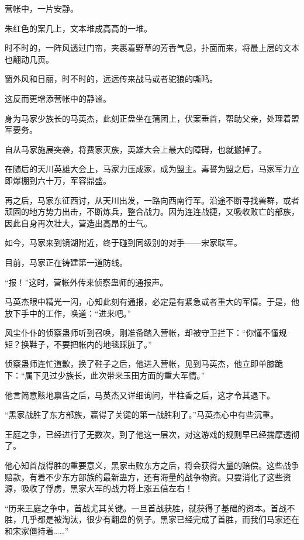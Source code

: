 
\begin{this_body}

营帐中，一片安静。

朱红色的案几上，文本堆成高高的一堆。

时不时的，一阵风透过门帘，夹裹着野草的芳香气息，扑面而来，将最上层的文本也翻动几页。

窗外风和日丽，时不时的，远远传来战马或者驼狼的嘶鸣。

这反而更增添营帐中的静谧。

身为马家少族长的马英杰，此刻正盘坐在蒲团上，伏案垂首，帮助父亲，处理着盟军要务。

自从马家施展突袭，将费家灭族，英雄大会上最大的障碍，也就搬掉了。

在随后的天川英雄大会上，马家力压成家，成为盟主。毒誓为盟之后，马家军力立即爆棚到六十万，军容鼎盛。

再之后，马家东征西讨，从天川出发，一路向西南行军。沿途不断寻找兽群，或者顽固的地方势力出击，不断炼兵，整合战力。因为连连战捷，又吸收败亡的部族，因此自身再次壮大，营造出高昂的士气。

如今，马家来到镜湖附近，终于碰到同级别的对手——宋家联军。

目前，马家正在铸建第一道防线。

“报！”这时，营帐外传来侦察蛊师的通报声。

马英杰眼中精光一闪，心知此刻有通报，必定是有紧急或者重大的军情。于是，他放下手中的工作，唤道：“进来吧。”

风尘仆仆的侦察蛊师听到召唤，刚准备踏入营帐，却被守卫拦下：“你懂不懂规矩？换鞋子，不要把帐内的地毯踩脏了。”

侦察蛊师连忙道歉，换了鞋子之后，他进入营帐，见到马英杰，他立即单膝跪下：“属下见过少族长，此次带来玉田方面的重大军情。”

他言简意赅地禀告之后，马英杰又详细询问，半柱香之后，这才令其退下。

“黑家战胜了东方部族，赢得了关键的第一战胜利了。”马英杰心中有些沉重。

王庭之争，已经进行了无数次，到了他这一层次，对这游戏的规则早已经揣摩透彻了。

他心知首战得胜的重要意义，黑家击败东方之后，将会获得大量的赔偿。这些战争赔款，有着不少东方部族的最新蛊方，还有海量的战争物资。只要消化了这些资源，吸收了俘虏，黑家大军的战力将上涨五倍左右！

“历来王庭之争中，首战尤其关键。一旦首战获胜，就获得了基础的资本。首战不胜，几乎都是被淘汰，很少有翻盘的例子。黑家已经完成了首胜，而我们马家还在和宋家僵持着……”


\end{this_body}
